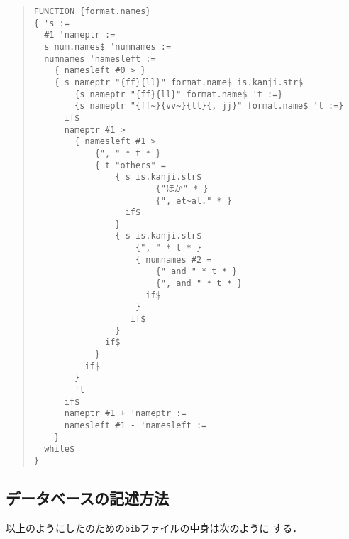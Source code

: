 \vskip2mm

{\baselineskip=11pt
\begin{quote}
\begin{verbatim}
FUNCTION {format.names}
{ 's :=
  #1 'nameptr :=
  s num.names$ 'numnames :=
  numnames 'namesleft :=
    { namesleft #0 > }
    { s nameptr "{ff}{ll}" format.name$ is.kanji.str$
        {s nameptr "{ff}{ll}" format.name$ 't :=}
        {s nameptr "{ff~}{vv~}{ll}{, jj}" format.name$ 't :=}
      if$
      nameptr #1 >
        { namesleft #1 >
            {", " * t * }
            { t "others" =
                { s is.kanji.str$
                        {"ほか" * }
                        {", et~al." * }
                  if$
                }
                { s is.kanji.str$
                    {", " * t * }
                    { numnames #2 =
                        {" and " * t * }
                        {", and " * t * }
                      if$
                    }
                   if$
                }
              if$
            }
          if$
        }
        't
      if$
      nameptr #1 + 'nameptr :=
      namesleft #1 - 'namesleft :=
    }
  while$
}

\end{verbatim}
\end{quote}
}

\subsection{データベースの記述方法}

以上のようにした\JBibTeX のための{\tt bib}ファイルの中身は次のように
する．

